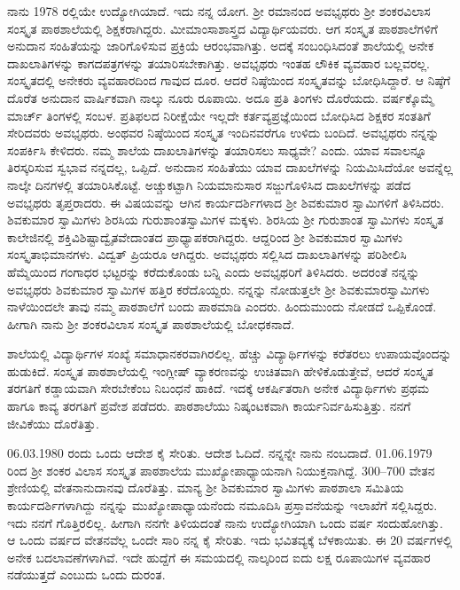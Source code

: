 {ನಾನು 1978 ರಲ್ಲಿಯೇ ಉದ್ಯೋಗಿಯಾದೆ.  ಇದು ನನ್ನ ಯೋಗ.  ಶ್ರೀ ರಮಾನಂದ ಅವಭೃಥರು ಶ್ರೀ ಶಂಕರವಿಲಾಸ ಸಂಸ್ಕೃತ ಪಾಠಶಾಲೆಯಲ್ಲಿ ಶಿಕ್ಷಕರಾಗಿದ್ದರು.  ಮೀಮಾಂಸಾಶಾಸ್ತ್ರದ ವಿದ್ಯಾರ್ಥಿಯವರು.  ಆಗ ಸಂಸ್ಕೃತ ಪಾಠಶಾಲೆಗಳಿಗೆ ಅನುದಾನ ಸಂಹಿತೆಯನ್ನು ಜಾರಿಗೊಳಿಸುವ ಪ್ರಕ್ರಿಯೆ ಆರಂಭವಾಗಿತ್ತು.  ಅದಕ್ಕೆ ಸಂಬಂಧಿಸಿದಂತೆ ಶಾಲೆಯಲ್ಲಿ ಅನೇಕ ದಾಖಲಾತಿಗಳನ್ನು ಕಾಗದಪತ್ರಗಳನ್ನು ತಯಾರಿಸಬೇಕಾಗಿತ್ತು.  ಅವಭೃಥರು ಇಂತಹ ಲೌಕಿಕ ವ್ಯವಹಾರ ಬಲ್ಲವರಲ್ಲ.  ಸಂಸ್ಕೃತದಲ್ಲಿ ಅನೇಕರು ವ್ಯವಹಾರದಿಂದ ಗಾವುದ ದೂರ.  ಆದರೆ ನಿಷ್ಠೆಯಿಂದ ಸಂಸ್ಕೃತವನ್ನು ಬೋಧಿಸಿದ್ದಾರೆ.  ಆ ನಿಷ್ಠೆಗೆ ದೊರೆತ ಅನುದಾನ ವಾರ್ಷಿಕವಾಗಿ ನಾಲ್ಕು ನೂರು ರೂಪಾಯಿ.  ಅದೂ ಪ್ರತಿ ತಿಂಗಳು ದೊರೆಯದು.  ವರ್ಷಕ್ಕೊಮ್ಮೆ ಮಾರ್ಚ್ ತಿಂಗಳಲ್ಲಿ ಸಂಬಳ.   ಪ್ರತಿಫಲದ ನಿರೀಕ್ಷೆಯೇ  ಇಲ್ಲದೇ ಕರ್ತವ್ಯಪ್ರಜ್ಞೆಯಿಂದ ಬೋಧಿಸಿದ ಶಿಕ್ಷಕರ ಸಂತತಿಗೆ ಸೇರಿದವರು ಅವಭೃಥರು.  ಅಂಥವರ ನಿಷ್ಠೆಯಿಂದ ಸಂಸ್ಕೃತ ಇಂದಿನವರೆಗೂ ಉಳಿದು ಬಂದಿದೆ.  ಅವಭೃಥರು ನನ್ನನ್ನು ಸಂಪರ್ಕಿಸಿ ಕೇಳಿದರು. ನಮ್ಮ ಶಾಲೆಯ ದಾಖಲಾತಿಗಳನ್ನು ತಯಾರಿಸಲು ಸಾಧ್ಯವೇ? ಎಂದು.  ಯಾವ ಸವಾಲನ್ನೂ ತಿರಸ್ಕರಿಸುವ ಸ್ವಭಾವ ನನ್ನದಲ್ಲ, ಒಪ್ಪಿದೆ.  ಅನುದಾನ ಸಂಹಿತೆಯು ಯಾವ ದಾಖಲೆಗಳನ್ನು ನಿಯಮಿಸಿದೆಯೋ ಅವನ್ನೆಲ್ಲ ನಾಲ್ಕೇ ದಿನಗಳಲ್ಲಿ ತಯಾರಿಸಿಕೊಟ್ಟೆ.  ಅಚ್ಚುಕಟ್ಟಾಗಿ ನಿಯಮಾನುಸಾರ ಸಜ್ಜುಗೊಳಿಸಿದ ದಾಖಲೆಗಳನ್ನು ಪಡೆದ ಅವಭೃಥರು ತೃಪ್ತರಾದರು.  ಈ ವಿಷಯವನ್ನು ಆಗಿನ ಕಾರ್ಯದರ್ಶಿಗಳಾದ ಶ್ರೀ ಶಿವಕುಮಾರ ಸ್ವಾಮಿಗಳಿಗೆ ತಿಳಿಸಿದರು.  ಶಿವಕುಮಾರ ಸ್ವಾಮಿಗಳು ಶಿರಸಿಯ ಗುರುಶಾಂತಸ್ವಾಮಿಗಳ ಮಕ್ಕಳು.  ಶಿರಸಿಯ ಶ್ರೀ ಗುರುಶಾಂತ ಸ್ವಾಮಿಗಳು ಸಂಸ್ಕೃತ ಕಾಲೇಜಿನಲ್ಲಿ  ಶಕ್ತಿವಿಶಿಷ್ಟಾದ್ವೈತವೇದಾಂತದ ಪ್ರಾಧ್ಯಾಪಕರಾಗಿದ್ದರು.  ಆದ್ದರಿಂದ ಶ್ರೀ ಶಿವಕುಮಾರ ಸ್ವಾಮಿಗಳು ಸಂಸ್ಕೃತಾಭಿಮಾನಗಳು. ವಿದ್ವತ್ ಪ್ರಿಯರೂ ಆಗಿದ್ದರು.  ಅವಭೃಥರು ಸಲ್ಲಿಸಿದ ದಾಖಲಾತಿಗಳನ್ನು ಪರಿಶೀಲಿಸಿ ಹೆಮ್ಮೆಯಿಂದ ಗಂಗಾಧರ ಭಟ್ಟರನ್ನು ಕರೆದುಕೊಂಡು ಬನ್ನಿ ಎಂದು ಅವಭೃಥರಿಗೆ ತಿಳಿಸಿದರು.  ಅದರಂತೆ ನನ್ನನ್ನು ಅವಭೃಥರು ಶಿವಕುಮಾರ ಸ್ವಾಮಿಗಳ ಹತ್ತಿರ ಕರೆದೊಯ್ದರು.  ನನ್ನನ್ನು ನೋಡುತ್ತಲೇ ಶ್ರೀ ಶಿವಕುಮಾರಸ್ವಾಮಿಗಳು ನಾಳೆಯಿಂದಲೇ ತಾವು ನಮ್ಮ ಪಾಠಶಾಲೆಗೆ ಬಂದು ಪಾಠಮಾಡಿ ಎಂದರು.  ಹಿಂದುಮುಂದು ನೋಡದೆ ಒಪ್ಪಿಕೊಂಡೆ.  ಹೀಗಾಗಿ ನಾನು ಶ್ರೀ ಶಂಕರವಿಲಾಸ ಸಂಸ್ಕೃತ ಪಾಠಶಾಲೆಯಲ್ಲಿ ಬೋಧಕನಾದೆ.  

ಶಾಲೆಯಲ್ಲಿ ವಿದ್ಯಾರ್ಥಿಗಳ ಸಂಖ್ಯೆ ಸಮಾಧಾನಕರವಾಗಿರಲಿಲ್ಲ.  ಹೆಚ್ಚು ವಿದ್ಯಾರ್ಥಿಗಳನ್ನು ಕರೆತರಲು ಉಪಾಯವೊಂದನ್ನು ಹುಡುಕಿದೆ.  ಸಂಸ್ಕೃತ ಪಾಠಶಾಲೆಯಲ್ಲಿ ಇಂಗ್ಲೀಷ್ ವ್ಯಾಕರಣವನ್ನು ಉಚಿತವಾಗಿ ಹೇಳಿಕೊಡುತ್ತೇವೆ, ಆದರೆ ಸಂಸ್ಕೃತ ತರಗತಿಗೆ ಕಡ್ಡಾಯವಾಗಿ ಸೇರಬೇಕೆಂಬ ನಿಬಂಧನೆ ಹಾಕಿದೆ.    ಇದಕ್ಕೆ ಆಕರ್ಷಿತರಾಗಿ ಅನೇಕ ವಿದ್ಯಾರ್ಥಿಗಳು ಪ್ರಥಮ ಹಾಗೂ ಕಾವ್ಯ ತರಗತಿಗೆ ಪ್ರವೇಶ ಪಡೆದರು.  ಪಾಠಶಾಲೆಯು ನಿಷ್ಕಂಟಕವಾಗಿ ಕಾರ್ಯನಿರ್ವಹಿಸುತ್ತಿತ್ತು.  ನನಗೆ ಜೀವಿಕೆಯು ದೊರೆತಿತ್ತು.  

06.03.1980 ರಂದು ಒಂದು ಆದೇಶ ಕೈ ಸೇರಿತು.  ಆದೇಶ ಓದಿದೆ.  ನನ್ನನ್ನೇ ನಾನು ನಂಬದಾದೆ.  01.06.1979 ರಿಂದ ಶ್ರೀ ಶಂಕರ ವಿಲಾಸ ಸಂಸ್ಕೃತ ಪಾಠಶಾಲೆಯ ಮುಖ್ಯೋಪಾಧ್ಯಾಯನಾಗಿ ನಿಯುಕ್ತನಾಗಿದ್ದೆ.  300–700 ವೇತನ ಶ್ರೇಣಿಯಲ್ಲಿ ವೇತನಾನುದಾನವು ದೊರೆತಿತ್ತು.  ಮಾನ್ಯ ಶ್ರೀ ಶಿವಕುಮಾರ ಸ್ವಾಮಿಗಳು ಪಾಠಶಾಲಾ ಸಮಿತಿಯ ಕಾರ್ಯದರ್ಶಿಗಳಾಗಿದ್ದು ನನ್ನನ್ನು ಮುಖ್ಯೋಪಾಧ್ಯಾಯನೆಂದು ನಮೂದಿಸಿ ಪ್ರಸ್ತಾವನೆಯನ್ನು ಇಲಾಖೆಗೆ ಸಲ್ಲಿಸಿದ್ದರು.  ಇದು ನನಗೆ ಗೊತ್ತಿರಲಿಲ್ಲ. ಹೀಗಾಗಿ ನನಗೇ ತಿಳಿಯದಂತೆ ನಾನು ಉದ್ಯೋಗಿಯಾಗಿ ಒಂದು ವರ್ಷ ಸಂದುಹೋಗಿತ್ತು.  ಆ ಒಂದು ವರ್ಷದ ವೇತನವೆಲ್ಲ ಒಂದೇ ಸಾರಿ ನನ್ನ ಕೈ ಸೇರಿತು.  ಇದು ಭವಿತವ್ಯಕ್ಕೆ ಬೆಳಕಾಯಿತು.  ಈ 20 ವರ್ಷಗಳಲ್ಲಿ ಅನೇಕ ಬದಲಾವಣೆಗಳಾಗಿವೆ.  ಇದೇ ಹುದ್ದೆಗೆ ಈ ಸಮಯದಲ್ಲಿ ನಾಲ್ಕರಿಂದ ಐದು ಲಕ್ಷ ರೂಪಾಯಿಗಳ ವ್ಯವಹಾರ ನಡೆಯುತ್ತದೆ ಎಂಬುದು ಒಂದು ದುರಂತ.  

}
